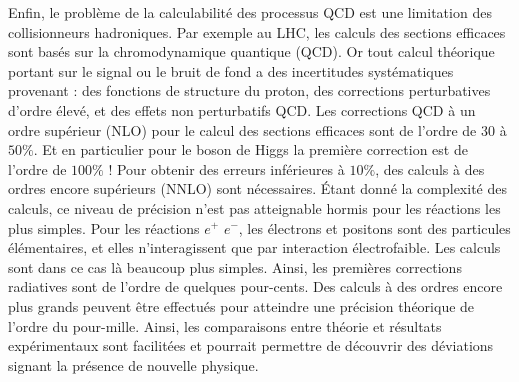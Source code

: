    Enfin, le probl\`eme de la calculabilit\'e des processus QCD est une limitation des collisionneurs hadroniques. Par exemple au LHC, les calculs des sections efficaces sont bas\'es sur la chromodynamique quantique (QCD). Or tout calcul th\'eorique portant sur le signal ou le bruit de fond a des incertitudes syst\'ematiques provenant : des fonctions de structure du proton, des corrections perturbatives d'ordre \'elev\'e, et des effets non perturbatifs QCD. Les corrections QCD \`a un ordre sup\'erieur (NLO) pour le calcul des sections efficaces sont de l'ordre de $30$ \`a $50\%$. Et en particulier pour le boson de Higgs la premi\`ere correction est de l'ordre de $100 \%$ ! Pour obtenir des erreurs inf\'erieures \`a $10 \%$, des calculs \`a des ordres encore sup\'erieurs (NNLO) sont n\'ecessaires. Étant donn\'e la complexit\'e des calculs, ce niveau de pr\'ecision n'est pas atteignable hormis pour les r\'eactions les plus simples. Pour les r\'eactions $e^+$ $e^-$, les électrons et positons sont des particules \'el\'ementaires, et elles n'interagissent que par interaction électrofaible. Les calculs sont dans ce cas l\`a beaucoup plus simples. Ainsi, les premi\`eres corrections radiatives sont de l'ordre de quelques pour-cents. Des calculs \`a des ordres encore plus grands peuvent \^etre effectu\'es pour atteindre une pr\'ecision th\'eorique de l'ordre du pour-mille. Ainsi, les comparaisons entre th\'eorie et résultats exp\'erimentaux sont facilit\'ees et pourrait permettre de d\'ecouvrir des d\'eviations signant la pr\'esence de nouvelle physique.
   
  
   \medskip
   
